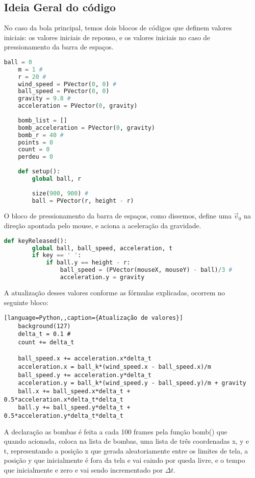 \documentclass[12pt,letterpaper]{article}
\begin{document}
\subsection*{Ideia Geral do código}
No caso da bola principal, temos dois blocos de códigos que definem valores iniciais: os valores iniciais de repouso, e os valores iniciais no caso de pressionamento da barra de espaços.

\begin{lstlisting}[language=Python,caption={Variáveis iniciais: Repouso}]
    ball = 0
    m = 1 #
    r = 20 #
    wind_speed = PVector(0, 0) #
    ball_speed = PVector(0, 0)
    gravity = 9.8 #
    acceleration = PVector(0, gravity)
    
    bomb_list = []
    bomb_acceleration = PVector(0, gravity)
    bomb_r = 40 #
    points = 0
    count = 0
    perdeu = 0
    
    def setup():
        global ball, r
        
        size(900, 900) #
        ball = PVector(r, height - r)
\end{lstlisting}

O bloco de pressionamento da barra de espaços, como dissemos, define uma $\vec{v}_0$ na direção apontada pelo mouse, e aciona a aceleração da gravidade.

\begin{lstlisting}[language=Python,caption={Variáveis Iniciais: Início do Movimento}]
    def keyReleased():
        global ball, ball_speed, acceleration, t
        if key == ' ':
            if ball.y == height - r:
                ball_speed = (PVector(mouseX, mouseY) - ball)/3 #
                acceleration.y = gravity
\end{lstlisting}
A atualização desses valores conforme as fórmulas explicadas, ocorrem no seguinte bloco:

\begin{lstlisting}[language=Python,,caption={Atualização de valores}]
    background(127)
    delta_t = 0.1 #
    count += delta_t
    
    ball_speed.x += acceleration.x*delta_t
    acceleration.x = ball_k*(wind_speed.x - ball_speed.x)/m
    ball_speed.y += acceleration.y*delta_t
    acceleration.y = ball_k*(wind_speed.y - ball_speed.y)/m + gravity
    ball.x += ball_speed.x*delta_t + 0.5*acceleration.x*delta_t*delta_t
    ball.y += ball_speed.y*delta_t + 0.5*acceleration.y*delta_t*delta_t
\end{lstlisting}

A declaração as bombas é feita a cada 100 frames pela função bomb() que quando acionada, coloca na lista de bombas, uma lista de três coordenadas x, y e t, representando a posição x que gerada aleatoriamente entre os limites de tela, a posição y que inicialmente é fora da tela e vai caindo por queda livre, e o tempo que inicialmente e zero e vai sendo incrementado por $\Delta t$.
\end{document}
